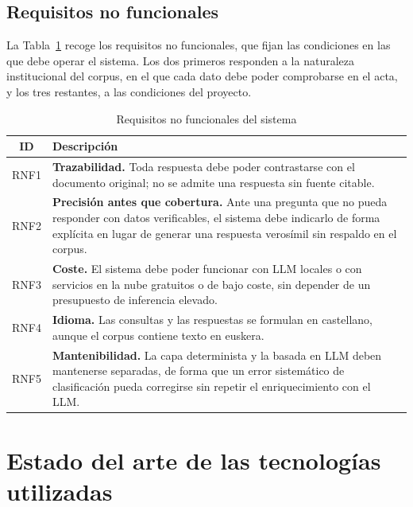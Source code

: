 \documentclass[11pt, a4paper]{report}
\begin{document}
	\subsection{Requisitos no funcionales}

	La Tabla~\ref{tab:requisitos-no-funcionales} recoge los requisitos no
	funcionales, que fijan las condiciones en las que debe operar el sistema. Los dos
	primeros responden a la naturaleza institucional del corpus, en el que cada
	dato debe poder comprobarse en el acta, y los tres restantes, a las
	condiciones del proyecto.

	\begin{table}[H]
		\centering
		\begin{tabularx}{\linewidth}{|c|X|}
			\hline
			\rowcolor{tabla-header}
			\textbf{ID} & \textbf{Descripción} \\
			\hline
			RNF1 & \textbf{Trazabilidad.} Toda respuesta debe poder contrastarse
			con el documento original; no se admite una respuesta sin fuente
			citable. \\
			\hline
			\rowcolor{fila-alterna}
			RNF2 & \textbf{Precisión antes que cobertura.} Ante una pregunta que
			no pueda responder con datos verificables, el sistema debe indicarlo
			de forma explícita en lugar de generar una respuesta verosímil sin
			respaldo en el corpus. \\
			\hline
			RNF3 & \textbf{Coste.} El sistema debe poder funcionar con LLM
			locales o con servicios en la nube gratuitos o de bajo
			coste, sin depender de un presupuesto de inferencia elevado. \\
			\hline
			\rowcolor{fila-alterna}
			RNF4 & \textbf{Idioma.} Las consultas y las respuestas se formulan en
			castellano, aunque el corpus contiene texto en euskera. \\
			\hline
			RNF5 & \textbf{Mantenibilidad.} La capa determinista y la basada en
			LLM deben mantenerse separadas, de forma que un error sistemático de
			clasificación pueda corregirse sin repetir el enriquecimiento con el
			LLM. \\
			\hline
		\end{tabularx}
		\caption{Requisitos no funcionales del sistema}
		\label{tab:requisitos-no-funcionales}
	\end{table}

	\section{Estado del arte de las tecnologías utilizadas}
\end{document}
